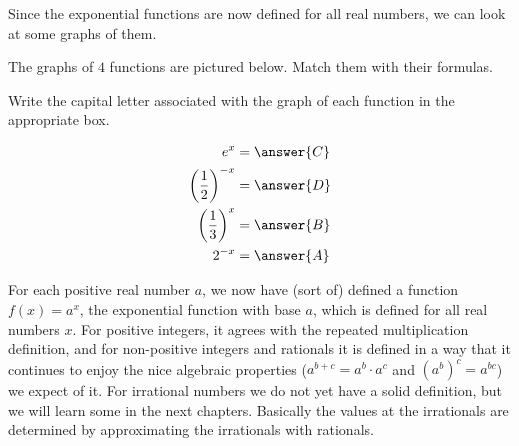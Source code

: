 \documentclass{ximera}
\begin{document}
Since the exponential functions are now defined for all real numbers, we can look at some graphs of them.

\begin{question}
	The graphs of $4$ functions are pictured below.  Match them with their formulas.
	
	\begin{image}
\end{image} 

Write the capital letter associated with the graph of each function in the appropriate box.

\begin{align*}
e^x &=  \answer{C}\\
\left(\frac{1}{2}\right)^{-x} &= \answer{D}\\
\left(\frac{1}{3}\right)^{x} &=  \answer{B}\\
 2^{-x} &= \answer{A}
\end{align*}

\end{question}

\begin{summary}
	For each positive real number $a$, we now have (sort of) defined a function $f(x) = a^x$, the exponential function with base $a$, which is defined for all real numbers $x$.  For positive integers, it agrees with the repeated multiplication definition, and for non-positive integers and rationals it is defined in a way that it continues to enjoy the nice algebraic properties ($a^{b+c} = a^b \cdot a^c$ and $(a^b)^c = a^{bc}$) we expect of it.  For irrational numbers we do not yet have a solid definition, but we will learn some in the next chapters.  Basically the values at the irrationals are determined by approximating the irrationals with rationals.  
\end{summary}
\end{document}
